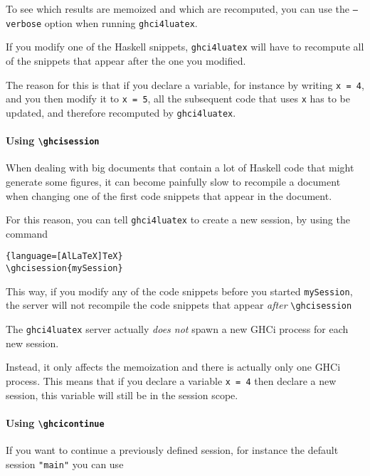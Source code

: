 \documentclass{article}
\begin{document}
\begin{tipbox}
  To see which results are memoized and which are recomputed, you can use the \texttt{--verbose} option when running \texttt{ghci4luatex}.
\end{tipbox}


If you modify one of the Haskell snippets, \texttt{ghci4luatex} will have to recompute all of the snippets that appear after the one you modified.

The reason for this is that if you declare a variable, for instance by writing \texttt{x = 4}, and you then modify it to \texttt{x = 5}, all the subsequent code that uses \texttt{x} has to be updated, and therefore recomputed by \texttt{ghci4luatex}.

\medskip

\paragraph{Using \texttt{\textbackslash ghcisession}}
When dealing with big documents that contain a lot of Haskell code that might generate some figures, it can become painfully slow to recompile a document when changing one of the first code snippets that appear in the document.

For this reason, you can tell \texttt{ghci4luatex} to create a new session, by using the command

\begin{lstlisting}{language=[AlLaTeX]TeX}
\ghcisession{mySession}
\end{lstlisting}

This way, if you modify any of the code snippets before you started \texttt{mySession}, the server will not recompile the code snippets that appear \emph{after} \texttt{\textbackslash ghcisession}

\begin{warningbox}
  The \texttt{ghci4luatex} server actually \emph{does not} spawn a new GHCi process for each new session.

  Instead, it only affects the memoization and there is actually only one GHCi process. This means that if you declare a variable \texttt{x = 4} then declare a new session, this variable will still be in the session scope.
\end{warningbox}

\paragraph{Using \texttt{\textbackslash ghcicontinue}} If you want to continue a previously defined session, for instance the default session \texttt{"main"} you can use
\end{document}
